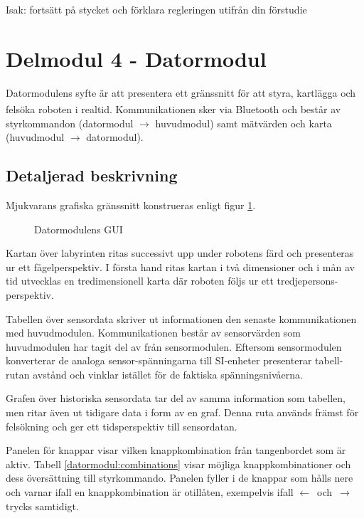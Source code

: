 \documentclass[11pt]{article}
\begin{document}
\begin{flushleft}
Isak: fortsätt på stycket och förklara regleringen utifrån din förstudie

\pagebreak
\section{Delmodul 4 - Datormodul}
Datormodulens syfte är att presentera ett gränssnitt för att styra, kartlägga och felsöka roboten i realtid. Kommunikationen sker via Bluetooth\textsuperscript{\circledR} och består av styrkommandon (datormodul $\rightarrow$ huvudmodul) samt mätvärden och karta (huvudmodul $\rightarrow$ datormodul). 

\subsection{Detaljerad beskrivning}
Mjukvarans grafiska gränssnitt konstrueras enligt figur \ref{datormodul:software}.

\begin{figure}[htbp]
\centering
\noindent\resizebox{.5\linewidth}{!}{
	}
	\caption{Datormodulens GUI \label{datormodul:software}}	
\end{figure}

Kartan över labyrinten ritas successivt upp under robotens färd och presenteras ur ett fågelperspektiv. I första hand ritas kartan i två dimensioner och i mån av tid utvecklas en tredimensionell karta där roboten följs ur ett tredjepersons-perspektiv. 

Tabellen över sensordata skriver ut informationen den senaste kommunikationen med huvudmodulen. Kommunikationen består av sensorvärden som huvudmodulen har tagit del av från sensormodulen. Eftersom sensormodulen konverterar de analoga sensor-spänningarna till SI-enheter presenterar tabell-rutan avstånd och vinklar istället för de faktiska spänningsnivåerna. 

Grafen över historiska sensordata tar del av samma information som tabellen, men ritar även ut tidigare data i form av en graf. Denna ruta används främst för felsökning och ger ett tidsperspektiv till sensordatan.

Panelen för knappar visar vilken knappkombination från tangenbordet som är aktiv. Tabell \ref{datormodul:combinations} visar möjliga knappkombinationer och dess översättning till styrkommando. Panelen fyller i de knappar som hålls nere och varnar ifall en knappkombination är otillåten, exempelvis ifall \mbox{$\leftarrow$ och $\rightarrow$} trycks samtidigt.


\end{flushleft}
\end{document}
